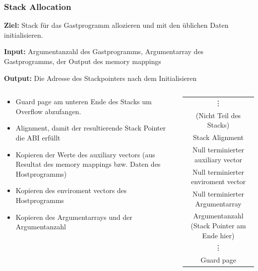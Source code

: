 \documentclass[german]{tum-presentation}
\begin{document}
\begin{frame}[fragile]
	\frametitle{Stack Allocation}
	\textbf{Ziel:} Stack für das Gastprogramm allozieren und mit den üblichen Daten initialisieren.

	\vspace{0.25cm}
	\textbf{Input:} Argumentanzahl des Gastprogramms, Argumentarray des Gastprogramms, der Output des memory mappings

	\textbf{Output:} Die Adresse des Stackpointers nach dem Initialisieren

	\pause
	\begin{columns}[c, onlytextwidth]
		\begin{column}{0.49\textwidth}
			\begin{itemize}
				\item<3-> Guard page am unteren Ende des Stacks um Overflow abzufangen.
				\item<3-> Alignment, damit der resultierende Stack Pointer die ABI erfüllt
				\item<3-> Kopieren der Werte des auxiliary vectors (aus Resultat des memory mappings bzw. Daten des Hostprogramms)
				\item<3-> Kopieren des enviroment vectors des Hostprogramms
				\item<3-> Kopieren des Argumentarrays und der Argumentanzahl
			\end{itemize}
		\end{column}

		\begin{column}{0.49\textwidth}

			\centering
			\begin{tabular}{|c|}
				\hline
				\rule[-1ex]{0pt}{3ex} \vdots                                      \\
				(Nicht Teil des Stacks)                                               \\
				\hline \hline
				\rule[-1ex]{0pt}{3ex} Stack Alignment                                 \\
				\hline
				\rule[-1ex]{0pt}{3ex} Null terminierter auxiliary vector              \\
				\hline
				\rule[-1ex]{0pt}{3ex} Null terminierter enviroment vector             \\
				\hline
				\rule[-1ex]{0pt}{3ex} Null terminierter Argumentarray                 \\
				\hline
				\rule[-1ex]{0pt}{3ex} Argumentanzahl (Stack Pointer am Ende hier) \\
				\hline
				\rule[-1ex]{0pt}{3ex} \vdots                                          \\
				\hline
				\rule[-1ex]{0pt}{3ex} Guard page                                      \\
				\hline
			\end{tabular}
		\end{column}
	\end{columns}
\end{frame}
\end{document}
